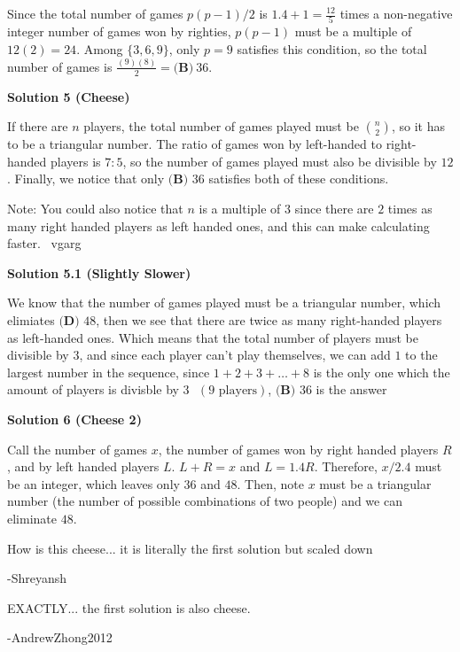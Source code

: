 \begin{enumerate}
 Since the total number of games $p(p-1)/2$  is $1.4+1 = \frac{12}{5}$ times a non-negative integer number of games won by righties, $p(p-1)$ must be a multiple of $12(2) = 24$. Among $\{3,6,9\}$, only $p = 9$ satisfies this condition,  so the total number of games is $\frac{(9)(8)}{2} = \boxed{\textbf{(B)}\ 36}.$




\textbf{Solution 5 (Cheese)}

If there are $n$ players, the total number of games played must be $\binom{n}{2}$, so it has to be a triangular number. The ratio of games won by left-handed to right-handed players is $7:5$, so the number of games played must also be divisible by $12$. Finally, we notice that only $\boxed{\textbf{(B) }36}$ satisfies both of these conditions.

 Note: You could also notice that $n$ is a multiple of $3$ since there are $2$ times as many right handed players as left handed ones, and this can make calculating faster. ~vgarg

 



\textbf{Solution 5.1 (Slightly Slower)}

We know that the number of games played must be a triangular number, which elimiates ${\textbf{(D) }48}$, then we see that there are twice as many right-handed players as left-handed ones. Which means that the total number of players must be divisible by $3$, and since each player can't play themselves, we can add $1$ to the largest number in the sequence, since $1 + 2 + 3 + \dots + 8$ is the only one which the amount of players is divisble by $3\text{ }(9 \text{ players})$, $\boxed{\textbf{(B) }36}$ is the answer

 



\textbf{Solution 6 (Cheese 2)}

Call the number of games $x$, the number of games won by right handed players $R$, and by left handed players $L$. $L+R=x$ and $L=1.4 R$. Therefore, $x/2.4$ must be an integer, which leaves only $36$ and $48$. Then, note $x$ must be a triangular number (the number of possible combinations of two people) and we can eliminate $48$.

 
How is this cheese... it is literally the first solution but scaled down

 -Shreyansh

 EXACTLY... the first solution is also cheese.

 -AndrewZhong2012


\end{enumerate}

